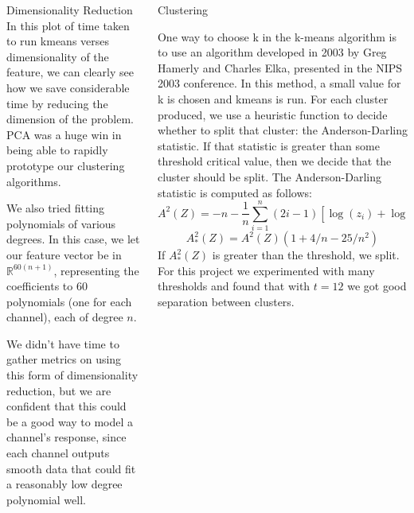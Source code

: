 \documentclass[final,t]{beamer}
\begin{document}
\begin{frame}{}
\begin{columns}[t]
\begin{column}{.3\linewidth}
\begin{block}{Dimensionality Reduction}
In this plot of time taken to run kmeans verses dimensionality of the
feature, we can clearly see how we save considerable time by reducing the
dimension of the problem. PCA was a huge win in being able to rapidly
prototype our clustering algorithms.

       \par
         We also tried fitting polynomials of various degrees. In this
         case, we let our feature vector be in $\mathbb{R}^{60(n+1)}$,
         representing the coefficients to 60 polynomials (one for each
         channel), each of degree $n$.

         We didn't have time to gather metrics on using this form of
         dimensionality reduction, but we are confident that this could be
         a good way to model a channel's response, since each channel
         outputs smooth data that could fit a reasonably low degree
         polynomial well.
     \end{block}
   \end{column}
   
    
    \begin{column}{.3\linewidth}
      \begin{block}{Clustering}
        \par
        One way to choose k in the k-means algorithm is to use an algorithm
developed in 2003 by Greg Hamerly and Charles Elka, presented in the NIPS
2003 conference. In this method, a small value for k is
chosen and kmeans is run. For each cluster produced, we use a
heuristic function to decide whether to split that cluster: the
Anderson-Darling statistic. If that statistic is greater than
some threshold critical value, then we decide that the cluster should be
split. The Anderson-Darling statistic is computed as follows:
$$
A^2(Z) = -n - \frac{1}{n}\sum_{i=1}^n (2i -
1)[\log(z_i)+\log(1-z_{n+1-i})]
$$$$
A^2_*(Z) = A^2(Z)(1 + 4/n - 25/n^2)
$$
If $A^2_*(Z)$ is greater than the threshold, we split. For this
project we experimented with many thresholds and found that with $t=12$ we
got good separation between clusters.


\end{block}
\end{column}
\end{columns}
\end{frame}
\end{document}
